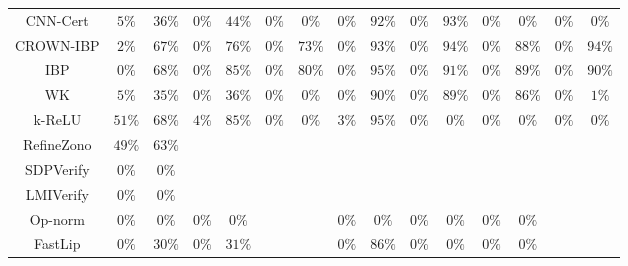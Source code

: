 \begin{table*}
{\begin{tabular}{c|c|c|c|c|c|c|c|c|c|c|c|c|c|c}
     CNN-Cert &         $5\%$ &        $36\%$ &         $0\%$ &        $44\%$ &         $0\%$ &         $0\%$ &         $0\%$ &        $92\%$ &         $0\%$ &        $93\%$ &         $0\%$ &         $0\%$ &         $0\%$ &         $0\%$ \\
    CROWN-IBP &         $2\%$ &        $67\%$ &         $0\%$ &        $76\%$ &         $0\%$ &        $73\%$ &         $0\%$ &        $93\%$ &         $0\%$ &        $94\%$ &         $0\%$ &        $88\%$ &         $0\%$ &        $94\%$ \\
          IBP &         $0\%$ &        $68\%$ &         $0\%$ &        $85\%$ &         $0\%$ &        $80\%$ &         $0\%$ &        $95\%$ &         $0\%$ &        $91\%$ &         $0\%$ &        $89\%$ &         $0\%$ &        $90\%$ \\
           WK &         $5\%$ &        $35\%$ &         $0\%$ &        $36\%$ &         $0\%$ &         $0\%$ &         $0\%$ &        $90\%$ &         $0\%$ &        $89\%$ &         $0\%$ &        $86\%$ &         $0\%$ &         $1\%$ \\
       k-ReLU &        $51\%$ &        $68\%$ &         $4\%$ &        $85\%$ &         $0\%$ &         $0\%$ &         $3\%$ &        $95\%$ &         $0\%$ &         $0\%$ &         $0\%$ &         $0\%$ &         $0\%$ &         $0\%$ \\
   RefineZono &        $49\%$ &        $63\%$ &               &               &               &               &               &               &               &               &               &               &               &               \\
    SDPVerify &         $0\%$ &         $0\%$ &               &               &               &               &               &               &               &               &               &               &               &               \\
    LMIVerify &         $0\%$ &         $0\%$ &               &               &               &               &               &               &               &               &               &               &               &               \\
      Op-norm &         $0\%$ &         $0\%$ &         $0\%$ &         $0\%$ &               &               &         $0\%$ &         $0\%$ &         $0\%$ &         $0\%$ &         $0\%$ &         $0\%$ &               &               \\
      FastLip &         $0\%$ &        $30\%$ &         $0\%$ &        $31\%$ &               &               &         $0\%$ &        $86\%$ &         $0\%$ &         $0\%$ &         $0\%$ &         $0\%$ &               &               \\

\end{tabular}}
\end{table*}
